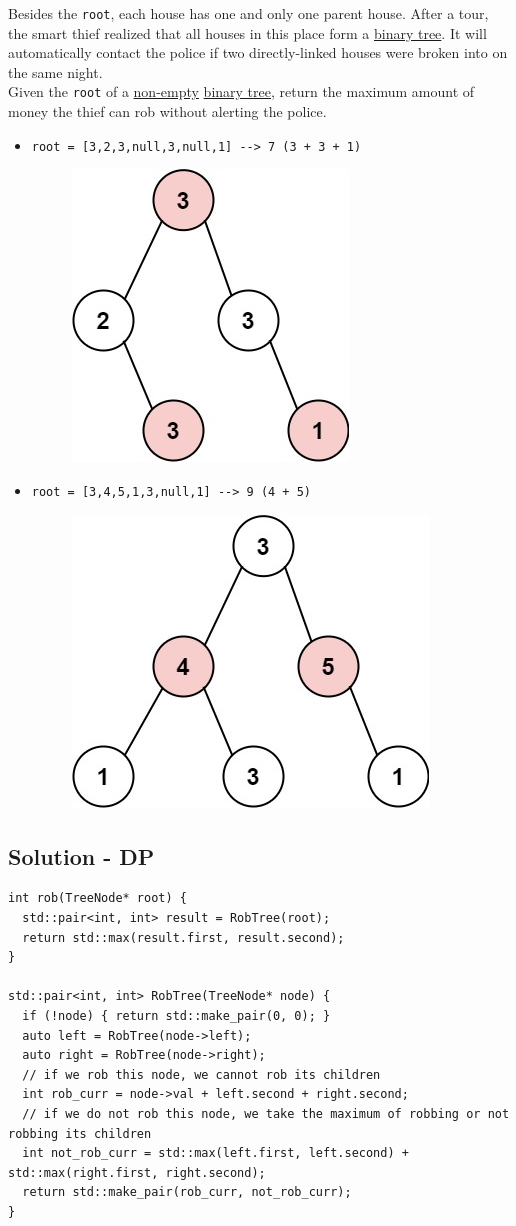 Besides the {\colorbox{CodeBackground}{\lstinline|root|}}, each house has one and only one parent house. After a tour, the smart thief realized that all houses in this place form a \ul{binary tree}. It will automatically contact the police if two directly-linked houses were broken into on the same night.\\

Given the {\colorbox{CodeBackground}{\lstinline|root|}} of a \ul{non-empty} \ul{binary tree}, return the maximum amount of money the thief can rob without alerting the police.

\begin{itemize}
\item {\colorbox{CodeBackground}{\lstinline|root = [3,2,3,null,3,null,1] --> 7 (3 + 3 + 1)|}}
\begin{figure}[H]
\centering
\includegraphics[width=0.2\linewidth]{images/lc0337_eg1}
\end{figure}
\item {\colorbox{CodeBackground}{\lstinline|root = [3,4,5,1,3,null,1] --> 9 (4 + 5)|}}
\begin{figure}[H]
\centering
\includegraphics[width=0.25\linewidth]{images/lc0337_eg2}
\end{figure}
\end{itemize}

\subsection*{Solution - DP}
\begin{lstlisting}
int rob(TreeNode* root) {
  std::pair<int, int> result = RobTree(root);
  return std::max(result.first, result.second);
}

std::pair<int, int> RobTree(TreeNode* node) {
  if (!node) { return std::make_pair(0, 0); }
  auto left = RobTree(node->left);
  auto right = RobTree(node->right);
  // if we rob this node, we cannot rob its children
  int rob_curr = node->val + left.second + right.second;
  // if we do not rob this node, we take the maximum of robbing or not robbing its children
  int not_rob_curr = std::max(left.first, left.second) + std::max(right.first, right.second);
  return std::make_pair(rob_curr, not_rob_curr);
}
\end{lstlisting}

